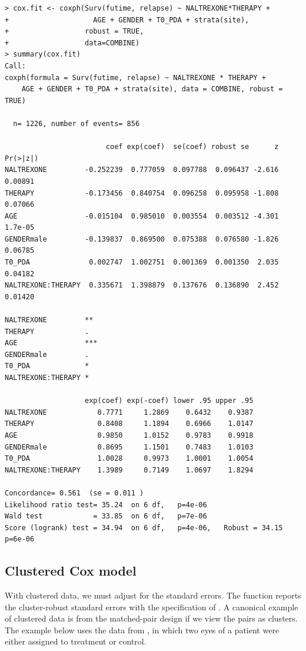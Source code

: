 \begin{lstlisting}
> cox.fit <- coxph(Surv(futime, relapse) ~ NALTREXONE*THERAPY + 
+                    AGE + GENDER + T0_PDA + strata(site), 
+                  robust = TRUE, 
+                  data=COMBINE)
> summary(cox.fit)
Call:
coxph(formula = Surv(futime, relapse) ~ NALTREXONE * THERAPY + 
    AGE + GENDER + T0_PDA + strata(site), data = COMBINE, robust = TRUE)

  n= 1226, number of events= 856 

                        coef exp(coef)  se(coef) robust se      z Pr(>|z|)
NALTREXONE         -0.252239  0.777059  0.097788  0.096437 -2.616  0.00891
THERAPY            -0.173456  0.840754  0.096258  0.095958 -1.808  0.07066
AGE                -0.015104  0.985010  0.003554  0.003512 -4.301  1.7e-05
GENDERmale         -0.139837  0.869500  0.075388  0.076580 -1.826  0.06785
T0_PDA              0.002747  1.002751  0.001369  0.001350  2.035  0.04182
NALTREXONE:THERAPY  0.335671  1.398879  0.137676  0.136890  2.452  0.01420
                      
NALTREXONE         ** 
THERAPY            .  
AGE                ***
GENDERmale         .  
T0_PDA             *  
NALTREXONE:THERAPY *  

                   exp(coef) exp(-coef) lower .95 upper .95
NALTREXONE            0.7771     1.2869    0.6432    0.9387
THERAPY               0.8408     1.1894    0.6966    1.0147
AGE                   0.9850     1.0152    0.9783    0.9918
GENDERmale            0.8695     1.1501    0.7483    1.0103
T0_PDA                1.0028     0.9973    1.0001    1.0054
NALTREXONE:THERAPY    1.3989     0.7149    1.0697    1.8294

Concordance= 0.561  (se = 0.011 )
Likelihood ratio test= 35.24  on 6 df,   p=4e-06
Wald test            = 33.85  on 6 df,   p=7e-06
Score (logrank) test = 34.94  on 6 df,   p=4e-06,   Robust = 34.15  p=6e-06
\end{lstlisting} 




\subsection{Clustered Cox model}


 With clustered data, we must adjust for the standard errors. The  function reports the cluster-robust standard errors with the specification of . A canonical example of clustered data is from the matched-pair design if we view the pairs as clusters. The example below uses the data from \citet{huster1989modelling}, in which two eyes of a patient were either assigned to treatment or control. 
 
